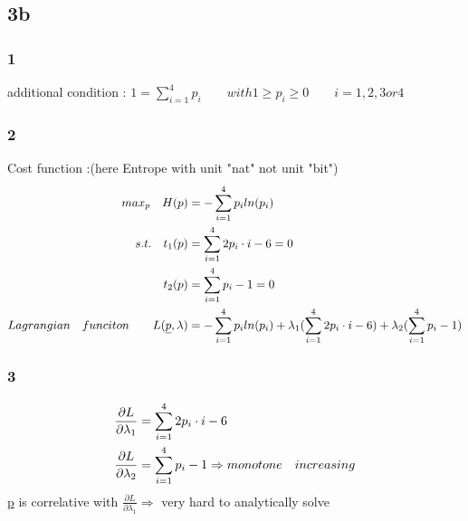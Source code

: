 \documentclass{article}
\begin{document}
\subsection*{3b}
\subsubsection*{1}
additional condition :
$
1=\sum\limits_{i=1}^{4}p_i\qquad with 1\geq p_i \geq 0 \qquad i = 1,2,3 or 4
$
\subsubsection*{2}
Cost function :(here Entrope with unit "nat" not unit "bit")\\
\begin{equation}\notag
\begin{aligned}
max_p \quad H(p)&=-\sum\limits_{i=1}^{4}p_i ln(p_i)\\
s.t. \quad t_1(p) &= \sum\limits_{i=1}^{4}2p_i \cdot i -6 = 0\\
t_2(p)&=\sum\limits_{i=1}^{4}p_i-1=0\\
Lagrangian\quad funciton \qquad L(\uline{p},\lambda) &= -\sum\limits_{i=1}^{4}p_i ln(p_i) + \lambda_1(\sum\limits_{i=1}^{4}2p_i \cdot i -6)+ \lambda_2(\sum\limits_{i=1}^{4}p_i-1)
\end{aligned}
\end{equation}
\subsubsection*{3}
\begin{equation}\notag
\begin{aligned}
\frac{\partial L}{\partial \lambda_1}&=\sum\limits_{i=1}^{4}2p_i \cdot i -6\\
\frac{\partial L}{\partial \lambda_2}&=\sum\limits_{i=1}^{4}p_i -1 \Rightarrow monotone\quad increasing
\end{aligned}
\end{equation}
\uline{p} is correlative with $\frac{\partial L}{\partial \lambda_1}  \Rightarrow$ very hard to analytically solve
\end{document}
